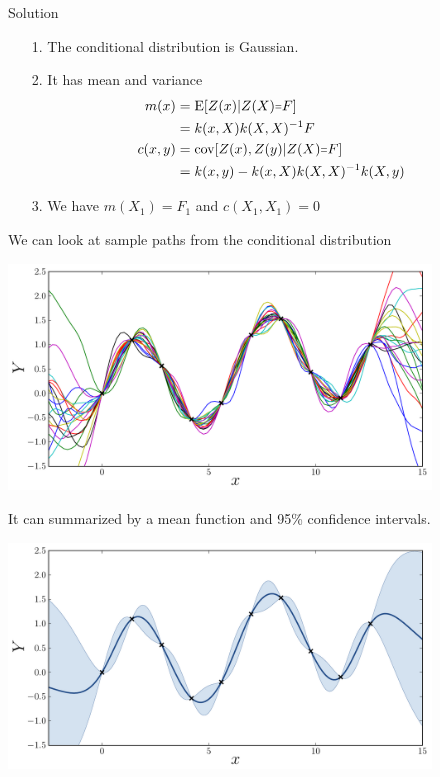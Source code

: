 \begin{frame}{}
\begin{exampleblock}{Solution}
	\begin{itemize}
		\item[1.] The conditional distribution is Gaussian.
		\item[2.] It has mean and variance
			\begin{equation*}
			\begin{split}
				m(x) &= \E[Z(x)|Z(X) \shorteq F] \\
				&= k(x,X) k(X,X)^{-1} F \\ \vspace{3mm}
				c(x,y) &= \Cov[Z(x),Z(y)|Z(X) \shorteq F] \\
				&= k(x,y) - k(x,X) k(X,X)^{-1} k(X,y)
			\end{split}
			\end{equation*}
		\item[3.] We have $m(X_1)=F_1$ and $c(X_1,X_1)=0$
		\end{itemize}
\end{exampleblock}
\end{frame}


\begin{frame}{}
We can look at sample paths from the conditional distribution
\begin{center}
\includegraphics[height=6cm]{1_stat_models/figures/R/Fig1-sim-cond}
\end{center}
\end{frame}

\begin{frame}{}
It can summarized by a mean function and 95\% confidence intervals.
\begin{center}
\includegraphics[height=6cm]{1_stat_models/figures/R/Fig1-GP}
\end{center}
\end{frame}

